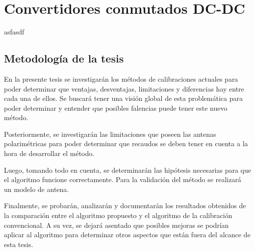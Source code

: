\chapter{Convertidores conmutados DC-DC}
\label{ch:convertidores}
asfasdf

\section{Metodología de la tesis}
    
En la presente tesis se investigarán los métodos de calibraciones 
actuales para poder determinar que ventajas, desventajas, limitaciones y 
diferencias hay entre cada una de ellos. Se buscará tener una visión global
de esta problemática para poder determinar y entender que posibles falencias
puede tener este nuevo método.

Posteriormente, se investigarán las limitaciones que poseen las antenas 
polarimétricas para poder determinar que recaudos se deben tener en cuenta a
la hora de desarrollar el método.

Luego, tomando todo en cuenta, se determinarán las hipótesis necesarias
para que el algoritmo funcione correctamente. Para la validación del método
se realizará un modelo de antena.
    
Finalmente, se probarán, analizarán y documentarán los resultados 
obtenidos de la comparación entre el algoritmo propuesto y el algoritmo de
la calibración convencional. A su vez, se dejará asentado que posibles 
mejoras se podrían aplicar al algoritmo para determinar otros aspectos que
están fuera del alcance de esta tesis.

